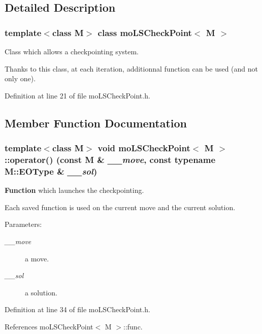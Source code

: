 \subsection{Detailed Description}
\subsubsection*{template$<$class M$>$ class mo\-LSCheck\-Point$<$ M $>$}

Class which allows a checkpointing system. 

Thanks to this class, at each iteration, additionnal function can be used (and not only one). 



Definition at line 21 of file mo\-LSCheck\-Point.h.

\subsection{Member Function Documentation}
\subsubsection{\setlength{\rightskip}{0pt plus 5cm}template$<$class M$>$ void {\bf mo\-LSCheck\-Point}$<$ M $>$::operator() (const M \& {\em \_\-\_\-move}, const typename M::EOType \& {\em \_\-\_\-sol})\hspace{0.3cm}{\tt  [inline]}}\label{classmo_l_s_check_point_2f9c1250279e3f49ec77a66c10029f1e}


{\bf Function} which launches the checkpointing. 

Each saved function is used on the current move and the current solution.

\begin{Desc}
\item[Parameters:]
\begin{description}
\item[{\em \_\-\_\-move}]a move. \item[{\em \_\-\_\-sol}]a solution. \end{description}
\end{Desc}


Definition at line 34 of file mo\-LSCheck\-Point.h.

References mo\-LSCheck\-Point$<$ M $>$::func.
